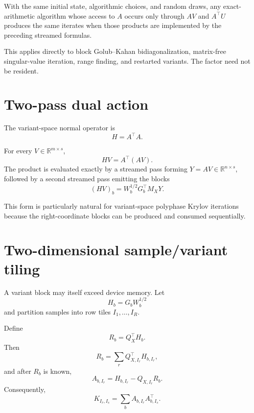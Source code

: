 \begin{corollary}\label{claim:final-10-3}
With the same initial state, algorithmic choices, and random draws, any
exact-arithmetic algorithm whose access to \(A\) occurs only through
\(AV\) and \(A^\top U\) produces the same iterates when those products are
implemented by the preceding streamed formulas.
\end{corollary}

This applies directly to block Golub--Kahan bidiagonalization, matrix-free
singular-value iteration, range finding, and restarted variants.  The
factor need not be resident.


\section{Two-pass dual action}\label{sec:final-11}

The variant-space normal operator is
\[
H=A^\top A.
\]

\begin{theorem}\label{claim:final-11-1}
For every \(V\in\mathbb R^{m\times s}\),
\[
\boxed{
HV=A^\top(AV).
}
\]
The product is evaluated exactly by a streamed pass forming
\(Y=AV\in\mathbb R^{n\times s}\), followed by a second streamed pass
emitting the blocks
\[
(HV)_b=W_b^{1/2}G_b^\top M_XY.
\]
\end{theorem}

This form is particularly natural for variant-space polyphase Krylov
iterations because the right-coordinate blocks can be produced and consumed
sequentially.


\section{Two-dimensional sample/variant tiling}\label{sec:final-12}

A variant block may itself exceed device memory.  Let
\[
H_b=G_bW_b^{1/2}
\]
and partition samples into row tiles \(I_1,\ldots,I_R\).

\begin{theorem}\label{claim:final-12-1}
Define
\[
R_b=Q_X^\top H_b.
\]
Then
\[
\boxed{
R_b
=
\sum_r
Q_{X,I_r}^\top H_{b,I_r},
}
\]
and after \(R_b\) is known,
\[
\boxed{
A_{b,I_r}
=
H_{b,I_r}-Q_{X,I_r}R_b.
}
\]
Consequently,
\[
\boxed{
K_{I_r,I_s}
=
\sum_b
A_{b,I_r}A_{b,I_s}^\top.
}
\]
\end{theorem}

